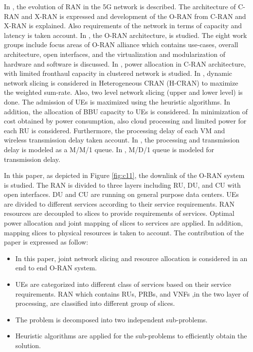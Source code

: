 \documentclass[conference]{IEEEtran}
\begin{document}
In \cite{oranT},  the evolution of RAN in the  5G network is described. The architecture of C-RAN and X-RAN is expressed and development of the O-RAN from C-RAN and X-RAN is explained. Also requirements of the network in terms of capacity and latency is taken account.
In \cite{oran12},  the O-RAN architecture, is studied. The eight work groups include focus areas of O-RAN alliance which contains use-cases, overall architecture,  open interfaces, and  the virtualization and modularization of hardware and software is discussed.
In \cite{motalleb2017optimal}, power allocation in C-RAN architecture, with limited fronthaul capacity in clustered network is studied.
In \cite{lee2018dynamic}, dynamic network slicing is considered in Heterogeneous CRAN (H-CRAN) to maximize the weighted sum-rate. Also, two level network slicing (upper and lower level) is done. The admission of UEs is maximized using the heuristic algorithms. In addition, the allocation of BBU capacity to UEs is considered.\newline
In \cite{frdl,luong2018novel,luong2018novel1,guo2016exploiting} minimization of cost obtained by power consumption, also cloud processing and limited power for each RU is considered. Furthermore, the processing delay of each VM and wireless transmission delay taken account. In \cite{frdl}, the processing and transmission delay is modeled as a M/M/1 queue. In \cite{guo2016exploiting}, M/D/1 queue is modeled for transmission delay.

In this paper, as  depicted in Figure \ref{fig:c11}, the downlink of the O-RAN system is studied. The RAN is divided to three layers including RU, DU, and CU with open interfaces. DU and CU are running on general purpose data centers. UEs are divided to different services according to their service requirements. RAN resources are decoupled to slices to provide requirements of services. Optimal power allocation and joint mapping of slices to services are applied. In addition, mapping slices to physical resources is taken to account. The contribution of the paper is expressed as follow:
\begin{itemize}
\item In this paper, joint network slicing and resource allocation is considered in an end to end O-RAN system.
\item UEs are categorized into different class of services based on their service requirements. RAN which contains RUs, PRBs, and VNFs ,in the two layer of processing, are classified into different group of slices.
\item The problem is decomposed into two independent sub-problems.
\item Heuristic algorithms are applied for the sub-problems to efficiently obtain the solution.
\end{itemize}
\end{document}
